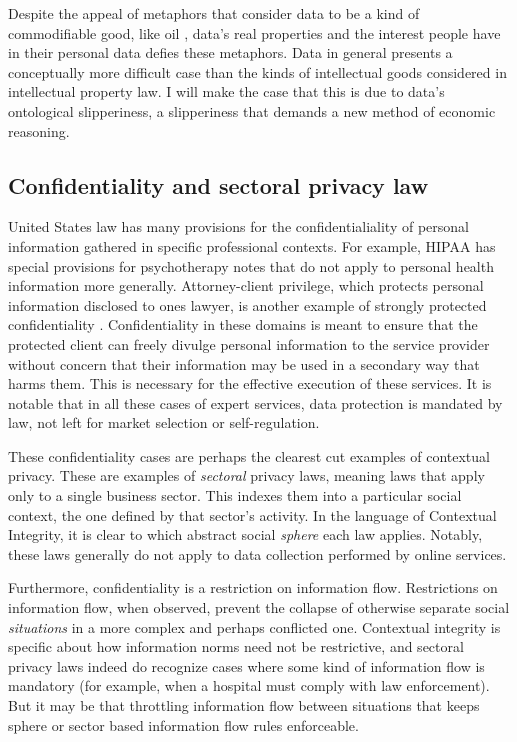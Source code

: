 \documentclass[../thesis.tex]{subfiles}
\begin{document}
Despite the appeal of metaphors that consider data
to be a kind of commodifiable good, like oil 
\citep{hirsch2013glass},
data's real properties and the interest people
have in their personal data defies these metaphors.
Data in general presents a conceptually more
difficult case than the kinds of intellectual
goods considered in intellectual property law.
I will make the case that this is due to data's
ontological slipperiness, a slipperiness that
demands a new method of economic reasoning.

\subsection{Confidentiality and sectoral privacy law}
\label{sec:confidentiality}

United States law has many provisions for the
confidentialiality of personal information gathered
in specific professional contexts.
For example, HIPAA has special provisions for
psychotherapy notes that do not apply to personal health
information more generally.
Attorney-client privilege, which protects personal information
disclosed to ones lawyer, is another example of strongly
protected confidentiality \cite{hazard1978historical} 
\cite{allen1990positive} \cite{richards2007privacy}.
Confidentiality in these domains is meant to ensure
that the protected client can freely divulge personal
information to the service provider without concern
that their information may be used in a secondary way
that harms them.
This is necessary for the effective execution of
these services.
It is notable that in all these cases of expert services,
data protection is mandated by law, not left for market
selection or self-regulation.

These confidentiality cases are perhaps the clearest
cut examples of contextual privacy.
These are examples of \emph{sectoral} privacy laws,
meaning laws that apply only to a single business sector.
This indexes them into a particular social context, the
one defined by that sector's activity.
In the language of Contextual Integrity,
it is clear to which abstract social \emph{sphere}
each law applies.
Notably, these laws generally do not apply to
data collection performed by online services.

Furthermore, confidentiality is a restriction on
information flow.
Restrictions on information flow, when observed,
prevent the collapse of otherwise separate
social \emph{situations} in a more complex and
perhaps conflicted one.
Contextual integrity is specific about
how information norms need not be restrictive,
and sectoral privacy laws indeed do recognize
cases where some kind of information flow
is mandatory (for example, when a hospital
must comply with law enforcement).
But it may be that throttling
information flow between situations that
keeps sphere or sector based information flow
rules enforceable.
\end{document}
